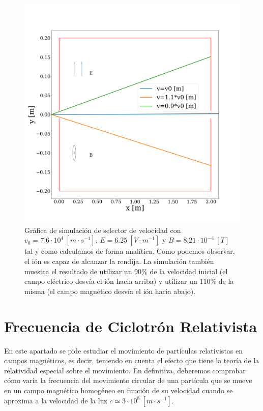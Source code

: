 \documentclass[journal]{IEEEtran}
\begin{document}
\begin{figure}[!htb]
    \includegraphics[width=\linewidth]{selector_simulacion}
    \caption{Gráfica de simulación de selector de velocidad con $v_0 = 7.6\cdot 10^4~[m\cdot s^{-1}]$, $E = 6.25~[V\cdot m^{-1}]$ y $B = 8.21\cdot 10^{-4}~[T]$ tal y como calculamos de forma analítica. Como podemos observar, el ión es capaz de alcanzar la rendija. La simulación también muestra el resultado de utilizar un $90\%$ de la velocidad inicial (el campo eléctrico desvía el ión hacia arriba) y utilizar un $110\%$ de la misma (el campo magnético desvía el ión hacia abajo).}
    \label{fig:selector_simulacion}
\end{figure}

\newpage

\section{Frecuencia de Ciclotrón Relativista}
\label{sec:frecuencia}

En este apartado se pide estudiar el movimiento de partículas relativistas en campos
magnéticos, es decir, teniendo en cuenta el efecto que tiene la teoría de la relatividad
especial sobre el movimiento. En definitiva, deberemos comprobar cómo varía la frecuencia del movimiento circular de una partícula que se mueve en un campo magnético homogéneo en función de su velocidad cuando se aproxima a la velocidad de la luz $c \simeq 3\cdot 10^8~[m\cdot s^{-1}]$.
\end{document}
